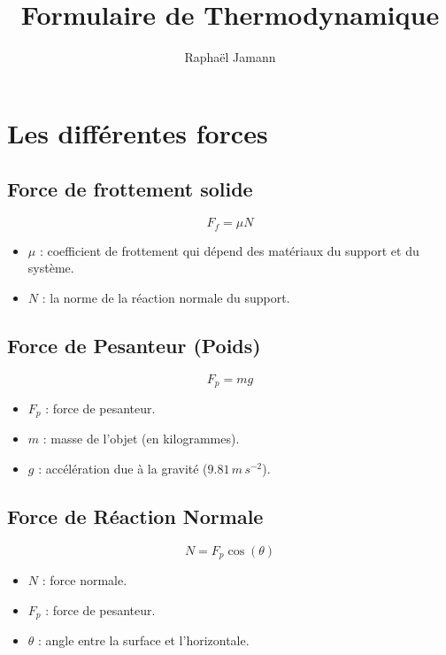\documentclass[a4paper,12pt]{article}
\title{Formulaire de Thermodynamique}
\author{Raphaël Jamann}
\date{}
\begin{document}
    \maketitle

    \section{Les différentes forces}

    \begin{multicols}{2}
        
        \subsection{Force de frottement solide}
            $$ F_f = \mu N $$ 
            \begin{itemize}[label=$\bullet$]
                \item $\mu$ : coefficient de frottement qui dépend des matériaux du support et du système.
                \item $N$ : la norme de la réaction normale du support.
            \end{itemize}
        \subsection{Force de Pesanteur (Poids)}
            $$ F_p = m g $$
            \begin{itemize}[label=$\bullet$]
                \item $F_p$ : force de pesanteur.
                \item $m$ : masse de l'objet (en kilogrammes).
                \item $g$ : accélération due à la gravité ($9.81 \, m \, s^{-2}$).
            \end{itemize}
            
        \subsection{Force de Réaction Normale}
                $$ N = F_p \cos(\theta) $$
            \begin{itemize}[label=$\bullet$]
                \item $N$ : force normale.
                \item $F_p$ : force de pesanteur.
                \item $\theta$ : angle entre la surface et l'horizontale.
            \end{itemize}
            

\end{multicols}
\end{document}

